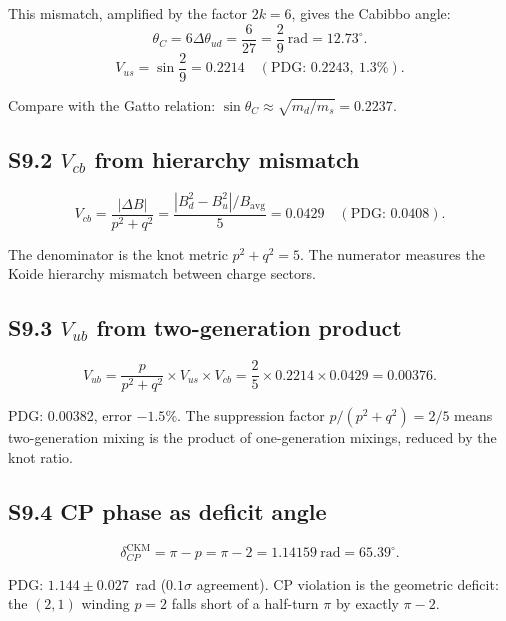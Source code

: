 \documentclass[11pt,a4paper]{article}
\begin{document}
This mismatch, amplified by the factor $2k = 6$, gives the Cabibbo angle:
\begin{equation}
  \theta_C = 6\Delta\theta_{ud} = \frac{6}{27} = \frac{2}{9}~\text{rad} = 12.73^\circ.
\end{equation}
\begin{equation}
  V_{us} = \sin\frac{2}{9} = 0.2214 \quad (\text{PDG: } 0.2243,\ 1.3\%).
\end{equation}

Compare with the Gatto relation: $\sin\theta_C \approx \sqrt{m_d/m_s} = 0.2237$.

\subsection{S9.2 \texorpdfstring{$V_{cb}$}{Vcb} from hierarchy mismatch}

\begin{equation}
  V_{cb} = \frac{|\Delta B|}{p^2+q^2} = \frac{|B_d^2 - B_u^2|/B_{\text{avg}}}{5} = 0.0429 \quad (\text{PDG: } 0.0408).
\end{equation}

The denominator is the knot metric $p^2+q^2 = 5$. The numerator measures the Koide hierarchy mismatch between charge sectors.

\subsection{S9.3 \texorpdfstring{$V_{ub}$}{Vub} from two-generation product}

\begin{equation}
  V_{ub} = \frac{p}{p^2+q^2}\times V_{us}\times V_{cb} = \frac{2}{5}\times 0.2214\times 0.0429 = 0.00376.
\end{equation}

PDG: 0.00382, error $-1.5\%$. The suppression factor $p/(p^2+q^2) = 2/5$ means two-generation mixing is the product of one-generation mixings, reduced by the knot ratio.

\subsection{S9.4 CP phase as deficit angle}

\begin{equation}
  \delta_{CP}^{\text{CKM}} = \pi - p = \pi - 2 = 1.14159~\text{rad} = 65.39^\circ.
\end{equation}

PDG: $1.144 \pm 0.027$~rad ($0.1\sigma$ agreement). CP violation is the geometric deficit: the $(2,1)$ winding $p = 2$ falls short of a half-turn $\pi$ by exactly $\pi - 2$.
\end{document}
